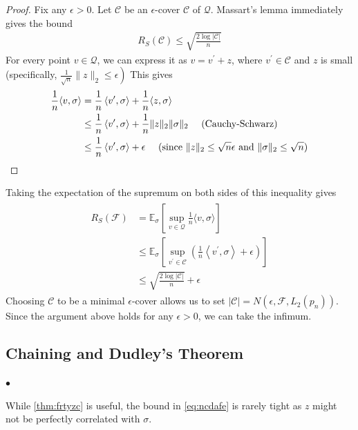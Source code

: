 \documentclass{article}
\begin{document}
\begin{proof}
 Fix any $\epsilon>0 .$ Let $\mathcal{C}$ be an $\epsilon$-cover $\mathcal{C}$ of $\mathcal{Q} .$ Massart's lemma immediately gives the bound
\begin{align*}
R_{S}(\mathcal{C}) \leq \sqrt{\frac{2 \log |\mathcal{C}|}{n}}
\end{align*}
For every point $v \in \mathcal{Q}$, we can express it as $v=v^{\prime}+z$, where $v^{\prime} \in \mathcal{C}$ and $z$ is small (specifically, $\left.\frac{1}{\sqrt{n}}\|z\|_{2} \leq \epsilon\right)$ This gives
\begin{align}
\frac{1}{n}\langle v, \sigma\rangle &=\frac{1}{n}\left\langle v^{\prime}, \sigma\right\rangle+\frac{1}{n}\langle z, \sigma\rangle \nonumber\\ 
& \leq \frac{1}{n}\left\langle v^{\prime}, \sigma\right\rangle+\frac{1}{n}\|z\|_{2}\|\sigma\|_{2} \quad \text { (Cauchy-Schwarz)}\label{eq:ncdafe}\\
& \leq \frac{1}{n}\left\langle v^{\prime}, \sigma\right\rangle+\epsilon \quad \text{ (since $\|z\|_{2} \leq \sqrt{n} \epsilon$  and $\|\sigma\|_{2} \leq \sqrt{n}$)}\nonumber
\end{align}
\end{proof} 
Taking the expectation of the supremum on both sides of this inequality gives
\begin{align*}
\begin{aligned}
R_{S}(\mathcal{F}) &=\mathbb{E}_{\sigma}\left[\sup _{v \in \mathcal{Q}} \frac{1}{n}\langle v, \sigma\rangle\right] \\
& \leq \mathbb{E}_{\sigma}\left[\sup _{v^{\prime} \in \mathcal{C}}\left(\frac{1}{n}\left\langle v^{\prime}, \sigma\right\rangle+\epsilon\right)\right] \\
& \leq \sqrt{\frac{2 \log |\mathcal{C}|}{n}}+\epsilon
\end{aligned}
\end{align*}
Choosing $\mathcal{C}$ to be a minimal $\epsilon$-cover allows us to set $|\mathcal{C}|=N\left(\epsilon, \mathcal{F}, L_{2}\left(p_{n}\right)\right) .$ Since the argument above holds for any $\epsilon>0$, we can take the infimum.

\subsection{Chaining and Dudley's Theorem}
$\bullet$  

While \cref{thm:frtyzc} is useful, the bound in \cref{eq:ncdafe} is rarely tight as $z$ might not be perfectly correlated with $\sigma .$ 
\end{document}
